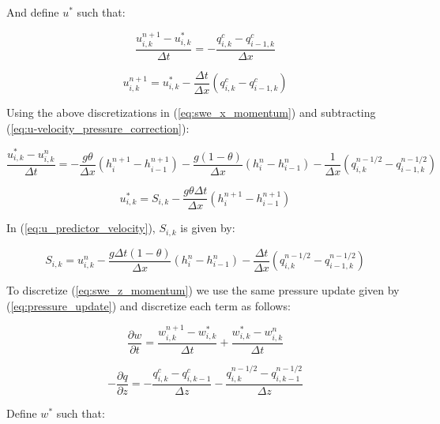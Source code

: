 \documentclass[12pt]{article}
\begin{document}
And define $u^*$ such that:

\begin{equation} \label{eq:u-velocity_pressure_correction}
\frac{u_{i,k}^{n+1} - u_{i,k}^*}{\Delta t} = -\frac{q_{i,k}^c - q_{i-1,k}^c}{\Delta x} 
\end{equation}

\begin{equation} \label{eq:u-velocity_update}
u_{i,k}^{n+1} = u_{i,k}^* - \frac{\Delta t}{\Delta x} (q_{i,k}^c - q_{i-1,k}^c)
\end{equation}

Using the above discretizations in (\ref{eq:swe_x_momentum}) and subtracting (\ref{eq:u-velocity_pressure_correction}):

\begin{equation*}
\frac{u_{i,k}^* - u_{i,k}^n}{\Delta t} = - \frac{g \theta}{\Delta x} (h_{i}^{n+1}-h_{i-1}^{n+1}) - \frac{g (1-\theta)}{\Delta x} (h_{i}^n - h_{i-1}^n) - \frac{1}{\Delta x} (q_{i,k}^{n-1/2} - q_{i-1,k}^{n-1/2})
\end{equation*}

\begin{equation} \label{eq:u_predictor_velocity}
u_{i,k}^* = S_{i,k} - \frac{g \theta \Delta t}{\Delta x} (h_{i}^{n+1} - h_{i-1}^{n+1})
\end{equation}

In (\ref{eq:u_predictor_velocity}), $S_{i,k}$ is given by:

\begin{equation*}
S_{i,k} = u_{i,k}^n - \frac{g \Delta t (1-\theta)}{\Delta x} (h_{i}^n - h_{i-1}^n) - \frac{\Delta t}{\Delta x} (q_{i,k}^{n-1/2} - q_{i-1,k}^{n-1/2})
\end{equation*}

To discretize (\ref{eq:swe_z_momentum}) we use the same pressure update given by (\ref{eq:pressure_update}) and discretize each term as follows:

\begin{equation*}
\frac{\partial w}{\partial t} = \frac{w_{i,k}^{n+1} - w_{i,k}^*}{\Delta t} + \frac{w_{i,k}^* - w_{i,k}^n}{\Delta t}
\end{equation*}

\begin{equation*}
- \frac{\partial q}{\partial z} = -\frac{q_{i,k}^c - q_{i,k-1}^c}{\Delta z} - \frac{q_{i,k}^{n-1/2} - q_{i,k-1}^{n-1/2}}{\Delta z}
\end{equation*}

Define $w^*$ such that:
\end{document}
